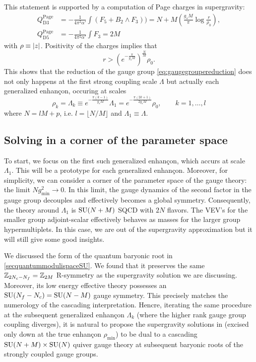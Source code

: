     This statement is supported by a computation of Page charges in supergravity:
    \begin{align}
        Q^{\text{Page}}_{\text{D3}} &= -\frac{1}{4\pi^2\alpha'}\int (F_5+B_2\wedge F_3))=N+M\left(\frac{g_sM}{\pi}\log\frac{r}{\rho_0}\right),\\
        Q^{\text{Page}}_{\text{D5}} &= -\frac{1}{4\pi^2\alpha'}\int F_3=2M
    \end{align}
    with $\rho\equiv\abs{z}$. Positivity of the charges implies that
    \begin{equation}
        r>(e^{-\frac{\pi}{g_sM}})^{\frac{N}{M}}\rho_0.
    \end{equation}
    This shows that the reduction of the gauge group \eqref{eq:gaugegroupereduction} does not only happens at the first strong coupling scale $\Lambda$ but actually each generalized enhançon, occuring at scales
    \begin{equation}
        \rho_k=\Lambda_k\equiv e^{-\frac{\pi(k-1)}{g_sM}}\Lambda_1 = e^{-\frac{\pi(2k+1)}{2g_sM}}\rho_0, \qquad k=1,\dots,l
    \end{equation}
    where $N=lM+p$, i.e. $l=\lfloor N/M\rfloor$ and $\Lambda_1\equiv\Lambda$.

    \subsection{Solving in a corner of the parameter space}

        To start, we focus on the first such generalized enhançon, which accurs at scale $\Lambda_1$. This will be a prototype for each generalized enhançon. Moreover, for simplicity, we can consider a corner of the parameter space of the gauge theory: the limit $Ng^2_{\text{min}}\to0$. In this limit, the gauge dynamics of the second factor in the gauge group decouples and effectively becomes a global symmetry. Consequently, the theory around $\Lambda_1$ is $\text{SU}(N+M)$ SQCD with $2N$ flavors. The VEV's for the smaller group adjoint-scalar effectively behaves as masses for the larger group hypermultiplets. In this case, we are out of the supergravity approximation but it will still give some good insights.

        We discussed the form of the quantum baryonic root in \ref{secquantummodulispaceSU}. We found that it preserves the same $\mathbb{Z}_{2N_c-N_f}=\mathbb{Z}_{2M}$ R-symmetry as the supergravity solution we are discussing. Moreover, its low energy effective theory possesses an $\text{SU}(N_f-N_c)=\text{SU}(N-M)$ gauge symmetry. This precisely matches the numerology of the cascading interpretation. Hencre, iterating the same procedure at the subsequent generalized enhançon $\Lambda_k$ (where the higher rank gauge group coupling diverges), it is natural to propose the supergravity solutions in  (excised only down at the true enhançon $\rho_{\text{min}}$) to be dual to a cascading $\text{SU}(N+M)\times\text{SU}(N)$ quiver gauge theory at subsequent baryonic roots of the strongly coupled gauge groups.

